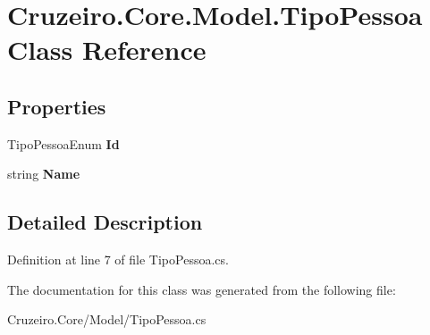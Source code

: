 \hypertarget{class_cruzeiro_1_1_core_1_1_model_1_1_tipo_pessoa}{}\section{Cruzeiro.\+Core.\+Model.\+Tipo\+Pessoa Class Reference}
\label{class_cruzeiro_1_1_core_1_1_model_1_1_tipo_pessoa}
\subsection*{Properties}
\begin{DoxyCompactItemize}
\item 
Tipo\+Pessoa\+Enum {\bfseries Id}\hypertarget{class_cruzeiro_1_1_core_1_1_model_1_1_tipo_pessoa_a301cc26f63444739ea2aeccf4bccd147}{}\label{class_cruzeiro_1_1_core_1_1_model_1_1_tipo_pessoa_a301cc26f63444739ea2aeccf4bccd147}

\item 
string {\bfseries Name}\hypertarget{class_cruzeiro_1_1_core_1_1_model_1_1_tipo_pessoa_a9b80a34c6543f190f4888ad487f0bba2}{}\label{class_cruzeiro_1_1_core_1_1_model_1_1_tipo_pessoa_a9b80a34c6543f190f4888ad487f0bba2}

\end{DoxyCompactItemize}


\subsection{Detailed Description}


Definition at line 7 of file Tipo\+Pessoa.\+cs.



The documentation for this class was generated from the following file\+:\begin{DoxyCompactItemize}
\item 
Cruzeiro.\+Core/\+Model/Tipo\+Pessoa.\+cs\end{DoxyCompactItemize}
